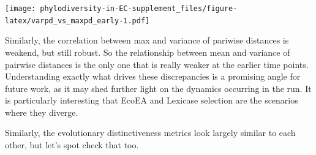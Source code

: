 \documentclass[]{book}
\newenvironment{Shaded}{\begin{snugshade}}{\end{snugshade}}
\newcommand{\DataTypeTok}[1]{\textcolor[rgb]{0.13,0.29,0.53}{#1}}
\newcommand{\DecValTok}[1]{\textcolor[rgb]{0.00,0.00,0.81}{#1}}
\newcommand{\KeywordTok}[1]{\textcolor[rgb]{0.13,0.29,0.53}{\textbf{#1}}}
\newcommand{\NormalTok}[1]{#1}
\newcommand{\OperatorTok}[1]{\textcolor[rgb]{0.81,0.36,0.00}{\textbf{#1}}}
\newcommand{\StringTok}[1]{\textcolor[rgb]{0.31,0.60,0.02}{#1}}
\begin{document}
\begin{Shaded}
\end{Shaded}

\texttt{[image: phylodiversity-in-EC-supplement\_files/figure-latex/varpd\_vs\_maxpd\_early-1.pdf]}

Similarly, the correlation between max and variance of pariwise distances is weakend, but still robust. So the relationship between mean and variance of pairwise distances is the only one that is really weaker at the earlier time points. Understanding exactly what drives these discrepancies is a promising angle for future work, as it may shed further light on the dynamics occurring in the run. It is particularly interesting that EcoEA and Lexicase selection are the scenarios where they diverge.

Similarly, the evolutionary distinctiveness metrics look largely similar to each other, but let's spot check that too.
\end{document}
